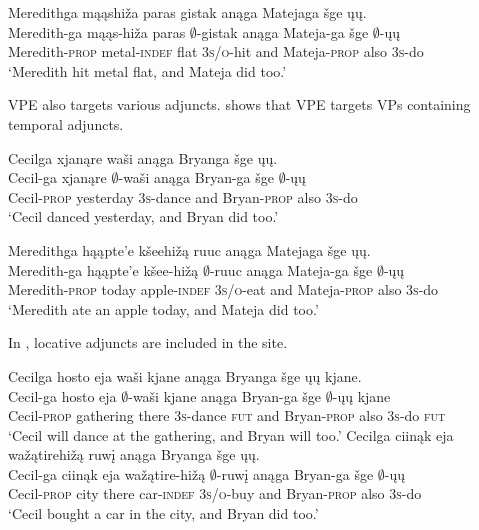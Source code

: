 \documentclass[output=paper]{LSP/langsci}
\begin{document}
\ex\label{ex:johnson:6b} 
\glll Meredithga  {\ob}{\sVP} mąąshiža paras gistak{\cb} anąga Matejaga šge {\ob}ųų{\cb}.\\
Meredith-ga {} mąąs-hiža paras $\emptyset$-gistak anąga Mateja-ga šge {\db}$\emptyset$-ųų\\
Meredith-\textsc{prop} {} metal-\textsc{indef} flat \textsc{3s/o}-hit and Mateja-\textsc{prop} also {\db}\textsc{3s}-do\\
\trans `Meredith hit metal flat, and Mateja did too.'
\z
\z

VPE also targets various adjuncts.  shows that VPE targets VPs containing temporal adjuncts. 
 
\ea\label{ex:johnson:7}
\ea 
\glll Cecilga {\ob}{\sVP} xjanąre waši{\cb} anąga Bryanga šge {\ob}ųų{\cb}.\\
Cecil-ga {} xjanąre $\emptyset$-waši anąga Bryan-ga šge {\db}$\emptyset$-ųų\\
Cecil-\textsc{prop} {} yesterday \textsc{3s}-dance and Bryan-\textsc{prop} also \textsc{3s-}do\\
\trans `Cecil danced yesterday, and Bryan did too.'

\ex 
\glll Meredithga  {\ob}{\sVP} hąąpte'e kšeehižą ruuc{\cb} anąga Matejaga šge {\ob}ųų{\cb}.\\
Meredith-ga {} hąąpte'e kšee-hižą $\emptyset$-ruuc anąga Mateja-ga šge {\db}$\emptyset$-ųų\\
Meredith-\textsc{prop} {} today apple-\textsc{indef  3s/o}-eat and Mateja-\textsc{prop} also {\db}\textsc{3s}-do\\
\trans `Meredith ate an apple today, and Mateja did too.'
\z
\z

In , locative adjuncts are included in the  site. 
 
\ea\label{ex:johnson:8}
\ea 
\glll Cecilga {\ob}{\sVP} hosto eja waši{\cb} kjane anąga Bryanga šge {\ob}ųų{\cb} kjane.\\
Cecil-ga {} hosto eja $\emptyset$-waši kjane anąga Bryan-ga šge {\db}$\emptyset$-ųų kjane\\
Cecil-\textsc{prop} {} gathering there \textsc{3s}-dance \textsc{fut} and Bryan-\textsc{prop} also \textsc{3s}-do \textsc{fut}\\
\trans `Cecil will dance at the gathering, and Bryan will too.'
\ex 
\glll Cecilga {\ob}{\sVP} ciinąk eja wažątirehižą ruwį{\cb} anąga Bryanga šge {\ob}ųų{\cb}.\\
Cecil-ga {} ciinąk eja wažątire-hižą $\emptyset$-ruwį anąga Bryan-ga šge {\db}$\emptyset$-ųų\\
Cecil-\textsc{prop} {} city there car-\textsc{indef} \textsc{3s/o}-buy and Bryan-\textsc{prop} also {\db}\textsc{3s}-do\\
\trans `Cecil bought a car in the city, and Bryan did too.'
\z
\z
\end{document}
